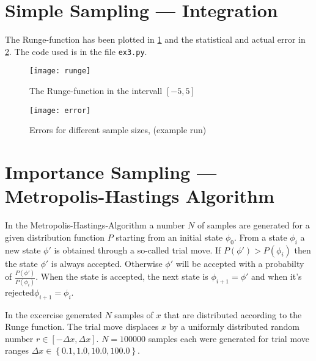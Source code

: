 \documentclass[a4paper,11pt,bibtotoc]{scrartcl}
\begin{document}
\section{Simple Sampling --- Integration}

The Runge-function has been plotted in \cref{fig:runge} and the statistical and
actual error in \cref{fig:error}. The code used is in the file \texttt{ex3.py}.

\begin{figure}[htb]
    \centering
    \texttt{[image: runge]}
    \caption{The Runge-function in the intervall $[-5,5]$}
    \label{fig:runge}
\end{figure}

\begin{figure}[htb]
    \centering
    \texttt{[image: error]}
    \caption{Errors for different sample sizes, (example run)}
    \label{fig:error}
\end{figure}

\section{Importance Sampling --- Metropolis-Hastings Algorithm}

In the Metropolis-Hastings-Algorithm a number $N$ of samples are generated
for a given distribution function $P$ starting from an initial state $\phi_0$.
From a state $\phi_i$ a new state $\phi\prime$ is obtained through a so-called trial move.
If $P\left(\phi\prime\right) > P\left(\phi_i\right)$ then the state
$\phi\prime$ is always accepted. Otherwise $\phi\prime$ will be accepted
with a probabilty of
$\frac{P\left(\phi\prime\right)}{P\left(\phi_i\right)}$.
When the state is accepted, the next state is $\phi_{i+1}=\phi\prime$ and
when it's rejected$\phi_{i+1}=\phi_i$.

In the excercise generated $N$ samples of $x$ that are distributed
according to the Runge function. The trial move displaces $x$ by a
uniformly distributed random number $r \in \left[-\Delta x,\Delta x\right]$.
$N=100000$ samples each were generated for trial move ranges
$\Delta x \in \left\{0.1, 1.0, 10.0, 100.0\right\}$.
\end{document}
